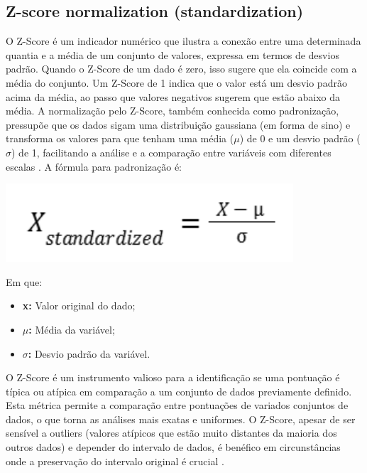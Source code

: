 \begin{apendicesenv}
\chapter{Z-score normalization (standardization)}

O Z-Score é um indicador numérico que ilustra a conexão entre uma determinada quantia e a média de um conjunto de valores, expressa em termos de desvios padrão. Quando o Z-Score de um dado é zero, isso sugere que ela coincide com a média do conjunto. Um Z-Score de 1 indica que o valor está um desvio padrão acima da média, ao passo que valores negativos sugerem que estão abaixo da média. A normalização pelo Z-Score, também conhecida como padronização, pressupõe que os dados sigam uma distribuição gaussiana (em forma de sino) e transforma os valores para que tenham uma média (\(\mu\)) de 0 e um desvio padrão (\(\sigma\)) de 1, facilitando a análise e a comparação entre variáveis com diferentes escalas \cite{jaiswal2024, maiseretorno2022}. A fórmula para padronização é:

\begin{center}
  \includegraphics[scale=0.8]{figuras/Z-Score.pdf}
\end{center}


Em que:
\begin{itemize}
  \item \textbf{x:} Valor original do dado;
  \item \textbf{\(\mu\):} Média da variável;
  \item \textbf{\(\sigma\):} Desvio padrão da variável.
\end{itemize}

O Z-Score é um instrumento valioso para a identificação se uma pontuação é típica ou atípica em comparação a um conjunto de dados previamente definido. Esta métrica permite a comparação entre pontuações de variados conjuntos de dados, o que torna as análises mais exatas e uniformes. O Z-Score, apesar de ser sensível a outliers (valores atípicos que estão muito distantes da maioria dos outros dados) e depender do intervalo de dados, é benéfico em circunstâncias onde a preservação do intervalo original é crucial \cite{sousa2019, maiseretorno2022}.


\end{apendicesenv}
